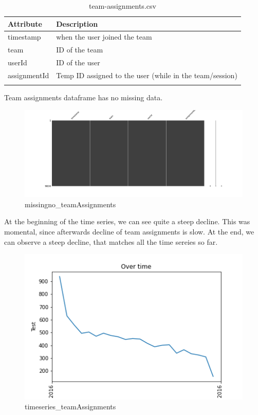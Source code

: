 \begin{center}
\begin{longtable}{ |l|l| } 
 \hline
 Attribute & Description\\ 
 \hline
 timestamp & when the user joined the team\\ 
 \hline
 team & ID of the team\\ 
 \hline
 userId & ID of the user\\ 
 \hline
 assignmentId & Temp ID assigned to the user (while in the team/session)\\ 
 \hline
\caption{team-assignments.csv}
\end{longtable}
\end{center}

Team assignments dataframe has no missing data.
\begin{figure}[H]
\includegraphics[scale=0.25]{img/Graphs/teamAssignments/missingno_teamAssignments.png}
\centering
\caption{missingno\_teamAssignments}
\label{fig:missingno_teamAssignments}
\end{figure}

At the beginning of the time series, we can see quite a steep decline. This was momental, since afterwards decline of team assignments is slow. At the end, we can observe a steep decline, that matches all the time sereies so far.
\begin{figure}[H]
\includegraphics[scale=0.85]{img/Graphs/teamAssignments/timeseries_teamAssignments.png}
\centering
\caption{timeseries\_teamAssignments}
\label{fig:timeseries_teamAssignments}
\end{figure}